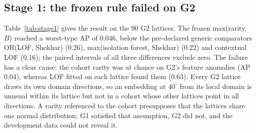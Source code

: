 \documentclass[preprint,review,12pt]{elsarticle}
\begin{document}
\begin{table}[t]
\caption{Experiment B (G1, four mixed conditions, 30 lattices each): mean AP for feature anomalies, arrangement anomalies and all anomalies, and the worst-type AP.}
\label{tab:dev}
\centering\footnotesize
{}
\end{table}

\subsection{Stage 1: the frozen rule failed on G2}
\label{sec:stage1}
Table~\ref{tab:stage1} gives the result on the 90 G2 lattices. The frozen max(rarity, $B$) reached a worst-type AP of 0.046, below the pre-declared generic comparators OR(LOF, Shekhar) (0.26), max(isolation forest, Shekhar) (0.22) and contextual LOF (0.16); the paired intervals of all three differences exclude zero. The failure has a clear cause: the cohort rarity was at chance on G2's feature anomalies (AP 0.04), whereas LOF fitted on each lattice found them (0.63). Every G2 lattice draws its own domain directions, so an embedding at $40^\circ$ from its local domain is unusual within its lattice but not in a cohort whose other lattices point in all directions. A rarity referenced to the cohort presupposes that the lattices share one normal distribution; G1 satisfied that assumption, G2 did not, and the development data could not reveal it.
\end{document}
